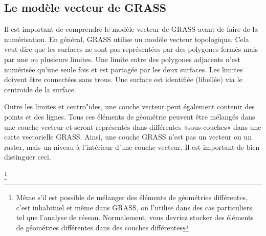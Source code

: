 \subsection{Le mod\`ele vecteur de GRASS}\label{label_vectmodel}
Il est important de comprendre le mod\`ele vecteur de GRASS avant de faire de la num\'erisation. En g\'en\'eral, GRASS utilise un mod\`ele vecteur topologique. Cela veut dire que les surfaces ne sont pas repr\'esent\'ees par des polygones ferm\'es mais par une ou plusieurs limites. Une limite entre des polygones adjacents n'est num\'eris\'ee qu'une seule fois et est partag\'ee par les deux surfaces. Les limites doivent \^etre connect\'ees sans trous. Une surface est identifi\'ee (libell\'ee) via le centroide de la surface.

	
Outre les limites et centro"ides, une couche vecteur peut \'egalement contenir des points et des lignes. Tous ces \'el\'ements de g\'eom\'etrie peuvent \^etre m\'elang\'es dans une couche vecteur et seront repr\'esent\'es dans diff\'erentes «sous-couches» dans une carte vectorielle GRASS. Ainsi, une couche GRASS n'est pas un vecteur ou un raster, mais un niveau \`a l'int\'erieur d'une couche vecteur. Il est important de bien distinguer ceci.

\footnote{M\^eme s'il est possible de m\'elanger des \'el\'ements de g\'eom\'etries diff\'erentes, c'est inhabituel et m\^eme dans GRASS, on l'utilise dans des cas particuliers tel que l'analyse de r\'eseau. Normalement, vous devriez stocker des \'el\'ements de g\'eom\'etries diff\'erentes dans des couches diff\'erentes}

